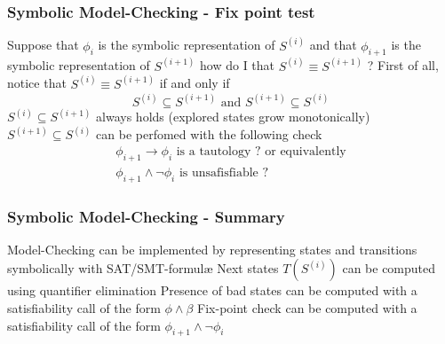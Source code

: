 \begin{frame}
  \frametitle{Symbolic Model-Checking - Fix point test}

  Suppose that $\phi_i$ is the symbolic representation of $S^{(i)}$
  and that $\phi_{i+1}$ is the symbolic representation of $S^{(i+1)}$
  how do I that $S^{(i)} \equiv S^{(i+1)}$ ?
  \vfill\pause
  First of all, notice that $S^{(i)} \equiv S^{(i+1)}$ if and only if
  $$
    S^{(i)} \subseteq S^{(i+1)} \mbox{ and } S^{(i+1)} \subseteq S^{(i)}
  $$
  \vfill\pause
  $S^{(i)} \subseteq S^{(i+1)}$ always holds (explored states grow monotonically)
  \vfill\pause
  $S^{(i+1)} \subseteq S^{(i)}$ can be perfomed with the following check
  $$
  \begin{array}{l}
    \phi_{i+1} \rightarrow \phi_i \mbox{ is a tautology ? or equivalently} \\
    \phi_{i+1} \wedge \neg \phi_i \mbox{ is unsafisfiable ? } 
  \end{array}
  $$

\end{frame}

\begin{frame}
  \frametitle{Symbolic Model-Checking - Summary}

  Model-Checking can be implemented by representing
  states and transitions symbolically with SAT/SMT-formul\ae
  \vfill
  Next states $T(S^{(i)})$ can be computed using quantifier elimination
  \vfill
  Presence of bad states can be computed with a satisfiability call of
  the form $\phi \wedge \beta$
  \vfill
  Fix-point check can be computed with a satisfiability call of the
  form $\phi_{i+1} \wedge \neg \phi_i$

\end{frame}

